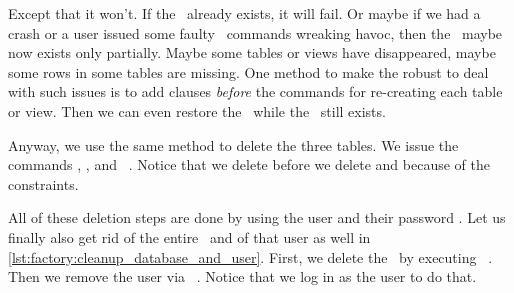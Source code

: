 Except that it won't.
If the \db\ already exists, it will fail.
Or maybe if we had a crash or a user issued some faulty \sql\ commands wreaking havoc, then the \db\ maybe now exists only partially.
Maybe some tables or views have disappeared, maybe some rows in some tables are missing.
One method to make the  robust to deal with such issues is to add  clauses \emph{before} the commands for re-creating each table or view.
Then we can even restore the \db\ while the \db\ still exists.%
%
\begin{sloppypar}%
Anyway, we use the same method to delete the three tables.
We issue the commands , , and ~\cite{PGDG:PD:DT}.
Notice that we delete  before we delete  and  because of the  constraints.%
\end{sloppypar}%
%
All of these deletion steps are done by using the user  and their password .
Let us finally also get rid of the entire \db\ and of that user as well in \cref{lst:factory:cleanup_database_and_user}.
First, we delete the \db\ by executing ~\cite{PGDG:PD:DD}.
Then we remove the user via ~\cite{PGDG:PD:DU}.
Notice that we log in as the  user  to do that.%
%
\FloatBarrier%
\endhsection%
%
